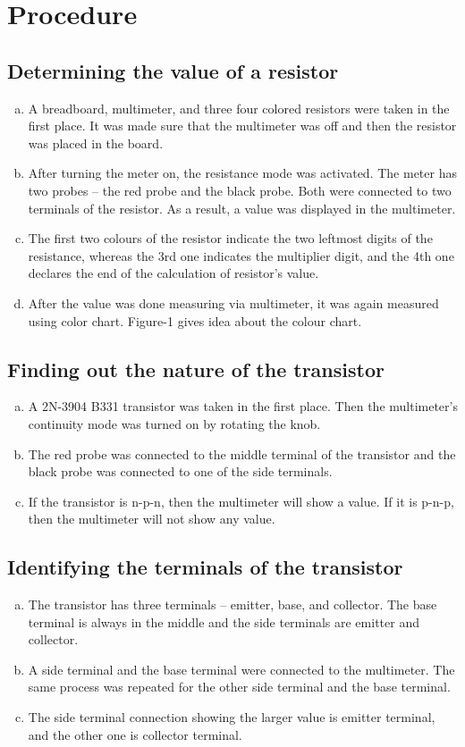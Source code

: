 \documentclass[12pt]{article}
\begin{document}
\newpage
\section{Procedure}
\subsection{Determining the value of a resistor}
\begin{enumerate}[(a)]
    \item A breadboard, multimeter, and three four colored resistors were taken in the first place. It was made sure that the multimeter was off and then the resistor was placed in the board.
    \item After turning the meter on, the resistance mode was activated. The meter has two probes -- the red probe and the black probe. Both were connected to two terminals of the resistor. As a result, a value was displayed in the multimeter.
    \item The first two colours of the resistor indicate the two leftmost digits of the resistance, whereas the 3rd one indicates the multiplier digit, and the 4th one declares the end of the calculation of resistor’s value.
    \item After the value was done measuring via multimeter, it was again measured using color chart. Figure-1 gives idea about the colour chart.
\end{enumerate}

\subsection{Finding out the nature of the transistor}
\begin{enumerate}[(a)]
    \item A 2N-3904 B331 transistor was taken in the first place. Then the multimeter's continuity mode was turned on by rotating the knob.
    \item The red probe was connected to the middle terminal of the transistor and the black probe was connected to one of the side terminals.
    \item If the transistor is n-p-n, then the multimeter will show a value. If it is p-n-p, then the multimeter will not show any value.
\end{enumerate}

\subsection{Identifying the terminals of the transistor}
\begin{enumerate}[(a)]
    \item The transistor has three terminals -- emitter, base, and collector. The base terminal is always in the middle and the side terminals are emitter and collector.
    \item A side terminal and the base terminal were connected to the multimeter. The same process was repeated for the other side terminal and the base terminal.
    \item The side terminal connection showing the larger value is emitter terminal, and the other one is collector terminal.
\end{enumerate}
\end{document}
